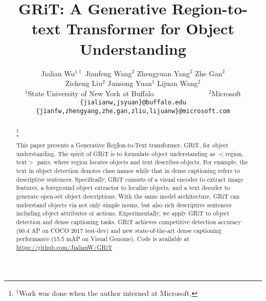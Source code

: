 \documentclass[10pt,twocolumn,letterpaper]{article}
\newcommand{\authorskip}{\hspace{12mm}}
\newcommand\blfootnote[1]{
  \begingroup
  \renewcommand\thefootnote{}\footnote{#1}
  \addtocounter{footnote}{-1}
  \endgroup
}
\begin{document}
\title{GRiT: A Generative Region-to-text Transformer for Object Understanding}

\author{
 Jialian Wu$^{1\dagger}$ \authorskip Jianfeng Wang$^{2}$ \authorskip  Zhengyuan Yang$^{2}$ \authorskip
 Zhe Gan$^{2}$ \\ Zicheng Liu$^{2}$ \authorskip Junsong Yuan$^{1}$ \authorskip Lijuan Wang$^{2}$\\[3mm]
 $^1$State University of New York at Buffalo ~~~~~~~~~~~~~~ $^2$Microsoft \\
 {\tt\small \{jialianw,jsyuan\}@buffalo.edu}\\ {\tt\small\{jianfw,zhengyang,zhe.gan,zliu,lijuanw\}@microsoft.com}
}


\begin{abstract}
\vspace{-3mm}
\blfootnote{$^\dagger$Work was done when the author interned at Microsoft.}
This paper presents a Generative RegIon-to-Text transformer, GRiT, for object understanding. The spirit of GRiT is to formulate object understanding as $<$region, text$>$ pairs, where region locates objects and text describes objects. For example, the text in object detection denotes class names while that in dense captioning refers to descriptive sentences. Specifically, GRiT consists of a visual encoder to extract image features, a foreground object extractor to localize objects, and a text decoder to generate open-set object descriptions. With the same model architecture, GRiT can understand objects via not only simple nouns, but also rich descriptive sentences including object attributes or actions. Experimentally, we apply GRiT to object detection and dense captioning tasks. GRiT achieves competitive detection accuracy (60.4 AP on COCO 2017 test-dev) and new state-of-the-art dense captioning performance (15.5 mAP on Visual Genome). Code is available at \url{https://github.com/JialianW/GRiT}
\end{abstract}
\end{document}
